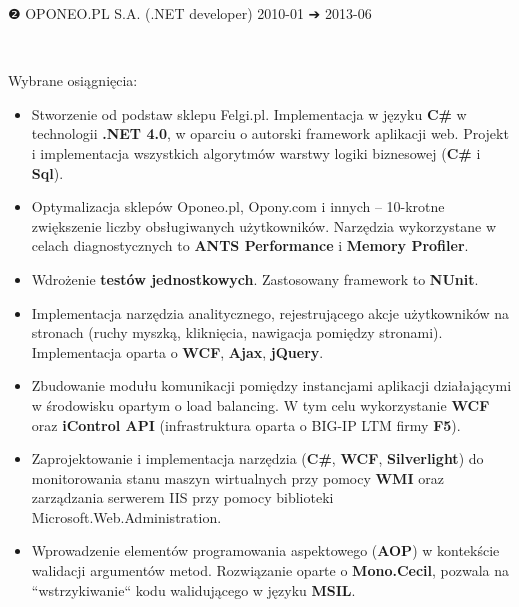 \documentclass[a4paper,11pt]{article}
\newcommand{\cvEnuItemBox}[1]
{%
	\hspace{26pt}\parbox{.93\textwidth}{#1}
}
\newcommand{\cvSectionEntry}[1]
{%
	\vspace{-1pt}\noindent\setlength{\fboxsep}{0pt}\setlength{\fboxrule}{0pt}%
	\colorbox{bg}
	{%
		\color{fg}%
		\begin{minipage}[t]{\textwidth}
			#1 %
		\end{minipage}%
	}%
}
\newcommand{\cvSectionEntryHeader}[4]
{%
	\vspace{8pt}\hspace{26pt}\parbox{.93\textwidth}
	{%
		\fontsize{13pt}{1em}\selectfont #1 \hspace{2pt} #2 \hfill #3 {\segoesym ➔} #4 %
	}\\
}
\newcommand{\cvSectionEntryBody}[2]
{%
	\cvEnuItemBox{\hspace{27pt}#1#2}
}
\begin{document}
\pagebreak\vspace*{-11pt}

\cvSectionEntry
{
	\cvSectionEntryHeader{❷}{OPONEO.PL S.A. (.NET developer)}{2010-01}{2013-06}

	\cvSectionEntryBody{Wybrane osiągnięcia:}
	{
		\begin{itemize}
			\setlength\itemsep{0em}
			\item Stworzenie od podstaw sklepu Felgi.pl. Implementacja w języku \textbf{C\#} w technologii \textbf{.NET 4.0}, w oparciu o autorski framework aplikacji web. Projekt i implementacja wszystkich algorytmów warstwy logiki biznesowej (\textbf{C\#} i \textbf{Sql}).
			\item Optymalizacja sklepów Oponeo.pl, Opony.com i innych -- 10-krotne zwiększenie liczby obsługiwanych użytkowników. Narzędzia wykorzystane w celach diagnostycznych to \textbf{ANTS Performance} i \textbf{Memory Profiler}.
			\item Wdrożenie \textbf{testów jednostkowych}. Zastosowany framework to \textbf{NUnit}.
			\item Implementacja narzędzia analitycznego, rejestrującego akcje użytkowników na stronach (ruchy myszką, kliknięcia, nawigacja pomiędzy stronami). Implementacja oparta o \textbf{WCF}, \textbf{Ajax}, \textbf{jQuery}.
			\item Zbudowanie modułu komunikacji pomiędzy instancjami aplikacji działającymi w środowisku opartym o load balancing. W tym celu wykorzystanie \textbf{WCF} oraz \textbf{iControl API} (infrastruktura oparta o BIG-IP LTM firmy \textbf{F5}).
			\item Zaprojektowanie i implementacja narzędzia (\textbf{C\#}, \textbf{WCF}, \textbf{Silverlight}) do monitorowania stanu maszyn wirtualnych przy pomocy \textbf{WMI} oraz zarządzania serwerem IIS przy pomocy biblioteki Microsoft.Web.Administration.
			\item Wprowadzenie elementów programowania aspektowego (\textbf{AOP}) w kontekście walidacji argumentów metod. Rozwiązanie oparte o \textbf{Mono.Cecil}, pozwala na ``wstrzykiwanie`` kodu walidującego w języku \textbf{MSIL}.
		\end{itemize}
	}
}
\end{document}
